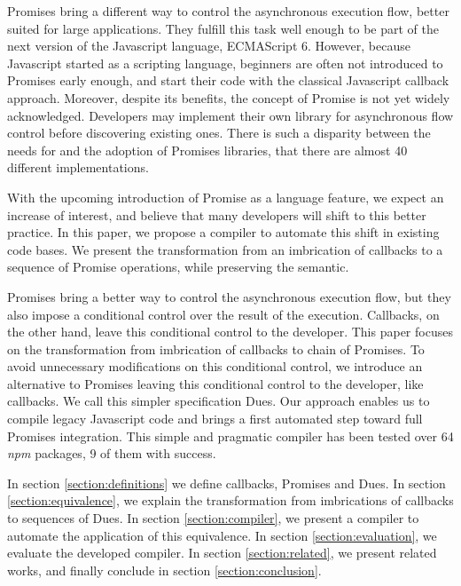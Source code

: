 Promises bring a different way to control the asynchronous execution flow, better suited for large applications.
They fulfill this task well enough to be part of the next version of the Javascript language, ECMAScript 6.
However, because Javascript started as a scripting language, beginners are often not introduced to Promises early enough, and start their code with the classical Javascript callback approach.
Moreover, despite its benefits, the concept of Promise is not yet widely acknowledged.
Developers may implement their own library for asynchronous flow control before discovering existing ones.
There is such a disparity between the needs for and the adoption of Promises libraries, that there are almost 40 different implementations.

With the upcoming introduction of Promise as a language feature, we expect an increase of interest, and believe that many developers will shift to this better practice.
In this paper, we propose a compiler to automate this shift in existing code bases.
We present the transformation from an imbrication of callbacks to a sequence of Promise operations, while preserving the semantic.

Promises bring a better way to control the asynchronous execution flow, but they also impose a conditional control over the result of the execution.
Callbacks, on the other hand, leave this conditional control to the developer.
This paper focuses on the transformation from imbrication of callbacks to chain of Promises.
To avoid unnecessary modifications on this conditional control, we introduce an alternative to Promises leaving this conditional control to the developer, like callbacks.
We call this simpler specification Dues.
Our approach enables us to compile legacy Javascript code and brings a first automated step toward full Promises integration.
This simple and pragmatic compiler has been tested over 64 \textit{npm} packages, 9 of them with success.

In section \ref{section:definitions} we define callbacks, Promises and Dues.
In section \ref{section:equivalence}, we explain the transformation from imbrications of callbacks to sequences of Dues.
In section \ref{section:compiler}, we present a compiler to automate the application of this equivalence.
In section \ref{section:evaluation}, we evaluate the developed compiler.
In section \ref{section:related}, we present related works, and finally conclude in section \ref{section:conclusion}.